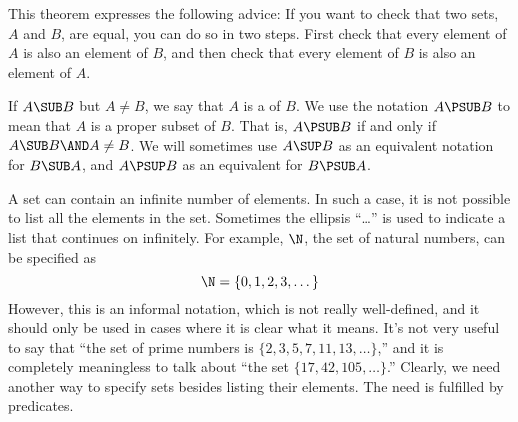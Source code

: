 This theorem expresses the following advice:  If you want to check that two
sets, $A$ and $B$, are equal, you can do so in two steps.  First check that
every element of $A$ is also an element of $B$, and then check that every 
element of $B$ is also an element of $A$.

If $A\SUB B$ but $A\not= B$, we say that $A$ is a  of $B$.
We use the notation $A\PSUB B$ to mean that $A$ is a proper subset of $B$.
That is, $A\PSUB B$ if and only if $A\SUB B \AND A\not= B$.  We will sometimes
use $A\SUP B$ as an equivalent notation for $B\SUB A$, and $A\PSUP B$ as
an equivalent for $B\PSUB A$.

 
\medbreak

A set can contain an infinite number of elements.  In such a case, it
is not possible to list all the elements in the set.  Sometimes the
ellipsis ``\dots'' is used to indicate a list that continues on infinitely.
For example, $\N$, the set of natural numbers, can be specified as
\[\N = \{ 0, 1, 2, 3, \dots \}\]
However, this is an informal notation, which is not really well-defined,
and it should only be used in cases where it is clear what it means.
It's not very useful to say that ``the set of prime numbers is
$\{2,3,5,7,11,13,\dots\}$,'' and it is completely meaningless to talk
about ``the set $\{17,42,105,\dots\}$.''  Clearly, we need another way to
specify sets besides listing their elements.  The need is fulfilled
by predicates.

